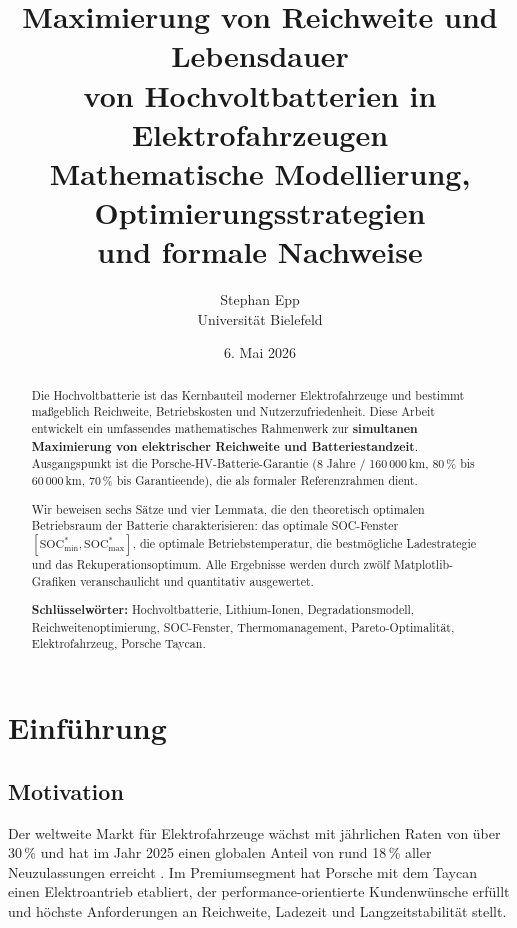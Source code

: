 ﻿\documentclass[a4paper,12pt]{article}
\title{\textbf{Maximierung von Reichweite und Lebensdauer\\
von Hochvoltbatterien in Elektrofahrzeugen}\\[0.5em]
{\large Mathematische Modellierung, Optimierungsstrategien\\
und formale Nachweise}}
\author{Stephan Epp\\[0.3em]
{\small Universit\"at Bielefeld}}
\date{6. Mai 2026}
\theoremstyle{definition}
\begin{document}
\maketitle

\begin{abstract}
\noindent
Die Hochvoltbatterie ist das Kernbauteil moderner Elektrofahrzeuge und bestimmt
ma\ss{}geblich Reichweite, Betriebskosten und Nutzerzufriedenheit.
Diese Arbeit entwickelt ein umfassendes mathematisches Rahmenwerk zur
\textbf{simultanen Maximierung von elektrischer Reichweite und Batteriestandzeit}.
Ausgangspunkt ist die Porsche-HV-Batterie-Garantie (8 Jahre / 160\,000\,km,
80\,\% bis 60\,000\,km, 70\,\% bis Garantieende), die als formaler Referenzrahmen
dient.

Wir beweisen sechs S\"atze und vier Lemmata, die den theoretisch optimalen
Betriebsraum der Batterie charakterisieren: das optimale SOC-Fenster
$[\mathrm{SOC}_{\min}^*, \mathrm{SOC}_{\max}^*]$, die optimale Betriebstemperatur,
die bestm\"ogliche Ladestrategie und das Rekuperationsoptimum.
Alle Ergebnisse werden durch zwölf Matplotlib-Grafiken veranschaulicht
und quantitativ ausgewertet.

\medskip
\noindent
\textbf{Schl\"usselw\"orter:} Hochvoltbatterie, Lithium-Ionen, Degradationsmodell,
Reichweitenoptimierung, SOC-Fenster, Thermomanagement, Pareto-Optimalit\"at,
Elektrofahrzeug, Porsche Taycan.
\end{abstract}

\tableofcontents
\newpage

\section{Einf\"uhrung}

\subsection{Motivation}

Der weltweite Markt f\"ur Elektrofahrzeuge w\"achst mit j\"ahrlichen Raten von
\"uber 30\,\% und hat im Jahr 2025 einen globalen Anteil von rund 18\,\%
aller Neuzulassungen erreicht \cite{IEA2025}. Im Premiumsegment hat Porsche
mit dem Taycan einen Elektroantrieb etabliert, der performance-orientierte
Kundenwünsche erf\"ullt und h\"ochste Anforderungen an Reichweite, Ladezeit
und Langzeitstabilit\"at stellt.
\end{document}
